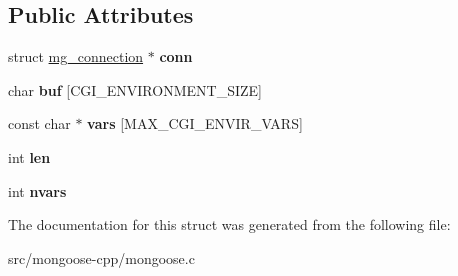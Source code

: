\subsection*{Public Attributes}
\begin{DoxyCompactItemize}
\item 
struct \hyperlink{structmg__connection}{mg\+\_\+connection} $\ast$ {\bfseries conn}\hypertarget{structcgi__env__block_a690d939b7e443d589d89803b36a1a20d}{}\label{structcgi__env__block_a690d939b7e443d589d89803b36a1a20d}

\item 
char {\bfseries buf} \mbox{[}C\+G\+I\+\_\+\+E\+N\+V\+I\+R\+O\+N\+M\+E\+N\+T\+\_\+\+S\+I\+ZE\mbox{]}\hypertarget{structcgi__env__block_acde439ca8be77fbb1061e760e3688d8d}{}\label{structcgi__env__block_acde439ca8be77fbb1061e760e3688d8d}

\item 
const char $\ast$ {\bfseries vars} \mbox{[}M\+A\+X\+\_\+\+C\+G\+I\+\_\+\+E\+N\+V\+I\+R\+\_\+\+V\+A\+RS\mbox{]}\hypertarget{structcgi__env__block_a0bf64b1ac2c4132baab8f16e891a7cbb}{}\label{structcgi__env__block_a0bf64b1ac2c4132baab8f16e891a7cbb}

\item 
int {\bfseries len}\hypertarget{structcgi__env__block_a6455757faba75fde382e24e5bea25cb5}{}\label{structcgi__env__block_a6455757faba75fde382e24e5bea25cb5}

\item 
int {\bfseries nvars}\hypertarget{structcgi__env__block_ab409c99d6f905fe2e467aba8aa081fc4}{}\label{structcgi__env__block_ab409c99d6f905fe2e467aba8aa081fc4}

\end{DoxyCompactItemize}


The documentation for this struct was generated from the following file\+:\begin{DoxyCompactItemize}
\item 
src/mongoose-\/cpp/mongoose.\+c\end{DoxyCompactItemize}
